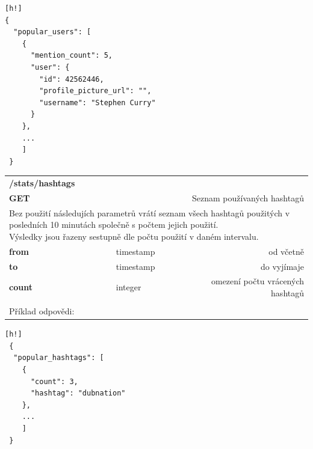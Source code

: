 \documentclass[thesis=B,czech]{FITthesis}[2012/06/26]
\begin{document}
\begin{lstlisting}[nolol=true][h!]
{
  "popular_users": [
    {
      "mention_count": 5,
      "user": {
        "id": 42562446,
        "profile_picture_url": "",
        "username": "Stephen Curry"
      }
    },
    ...
    ]
 }
\end{lstlisting} 

\begin{table}[h]
\begin{tabular}{llllr}
\rowcolor[HTML]{EFEFEF}
\large \textbf{/stats/hashtags}        &         &                 &        & \multicolumn{1}{l}{}                \\
\rowcolor[HTML]{EFEFEF}
\textbf{GET}          &         &                 &        & Seznam používaných hashtagů                        \\
\multicolumn{5}{l}{\parbox[t]{12.8cm}{Bez použití následujích parametrů vrátí seznam všech hashtagů použitých v posledních 10 minutách společně s počtem jejich použití. \\ Výsledky jsou řazeny sestupně dle počtu použití v daném intervalu. }  } \\
\textbf{from}         &         & timestamp       &        & od včetně                           \\
\textbf{to}           &         & timestamp       &        & do vyjímaje                         \\
\textbf{count}        &         & integer         &        & omezení počtu vrácených hashtagů     \\
 & & & & \\
 Příklad odpovědi: 
\end{tabular}
\end{table}

\begin{lstlisting}[nolol=true][h!]
 {
  "popular_hashtags": [
    {
      "count": 3,
      "hashtag": "dubnation"
    },
    ...
    ]
 }
\end{lstlisting} 
\end{document}
